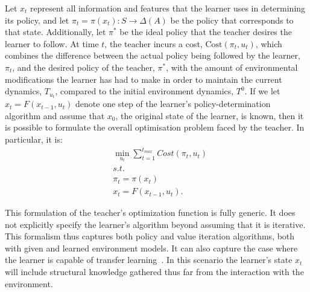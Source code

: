 Let $x_t$ represent all information and features that the learner uses
in determining its policy, and let
$\pi_t=\pi(x_t):S\rightarrow\Delta(A)$ be the policy that corresponds
to that state.  Additionally, let $\pi^*$ be the ideal policy that the
teacher desires the learner to follow.  At time $t$, the teacher
incurs a cost, $\mathrm{Cost}(\pi_t,u_t)$, which combines the
difference between the actual policy being followed by the learner,
$\pi_t$, and the desired policy of the teacher, $\pi^*$, with the
amount of environmental modifications the learner has had to make in
order to maintain the current dynamics, $T_{u_t}$, compared to the
initial environment dynamics, $T^0$. If we let $x_t=F(x_{t-1},u_t)$
denote one step of the learner's policy-determination algorithm and
assume that $x_0$, the original state of the learner,  is known, then it is possible to formulate the overall optimisation problem faced by the teacher.
In particular, it is:
\begin{eqnarray*}
&\min\limits_{u_t}\sum\limits_{t=1}^{t_{max}}Cost(\pi_t,u_t)\\
&s.t.\\
&\pi_t=\pi(x_t)\\
&x_t=F(x_{t-1},u_t).
\end{eqnarray*}




This formulation of the teacher's optimization function is fully generic. It does not explicitly specify 
the learner's algorithm beyond assuming that it is iterative. This formalism thus captures both policy 
and value iteration algorithms, both with given and learned environment models.
It can also
 capture the case where the learner
is capable of transfer learning~\cite{ taylor_stone_2009}. In this scenario the learner's state $x_t$
will include structural knowledge gathered thus far from the
interaction with the environment. 

